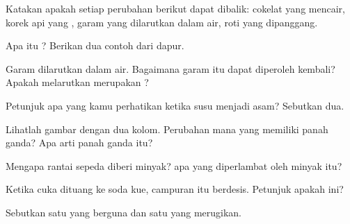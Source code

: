 \begin{exercise}[$\star$]\label{exo:g5:irreversible-changes:1}
Katakan apakah setiap perubahan berikut dapat dibalik: cokelat yang
mencair, korek api yang , garam yang dilarutkan dalam air, roti
yang dipanggang.
\end{exercise}

\begin{exercise}[$\star$]\label{exo:g5:irreversible-changes:2}
Apa itu ? Berikan dua contoh dari dapur.
\end{exercise}

\begin{exercise}[$\star$]\label{exo:g5:irreversible-changes:3}
Garam dilarutkan dalam air. Bagaimana garam itu dapat diperoleh
kembali? Apakah melarutkan merupakan ?
\end{exercise}

\begin{exercise}[$\star$]\label{exo:g5:irreversible-changes:4}
Petunjuk  apa yang kamu perhatikan ketika susu menjadi
asam? Sebutkan dua.
\end{exercise}

\begin{exercise}[$\star$]\label{exo:g5:irreversible-changes:5}
Lihatlah gambar dengan dua kolom. Perubahan mana yang memiliki panah
ganda? Apa arti panah ganda itu?
\end{exercise}

\begin{exercise}[$\star$]\label{exo:g5:irreversible-changes:6}
Mengapa rantai sepeda diberi minyak?  apa yang
diperlambat oleh minyak itu?
\end{exercise}

\begin{exercise}[$\star$]\label{exo:g5:irreversible-changes:7}
Ketika cuka dituang ke soda kue, campuran itu berdesis. Petunjuk apakah
ini?
\end{exercise}

\begin{exercise}[$\star$]\label{exo:g5:irreversible-changes:8}
Sebutkan satu  yang berguna dan satu yang merugikan.
\end{exercise}

